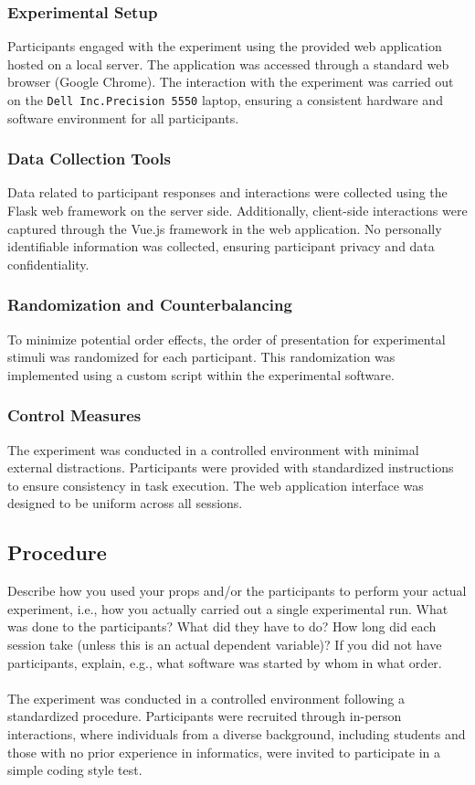 \documentclass{article}
\begin{document}
\subsubsection*{Experimental Setup}
Participants engaged with the experiment using the provided web application hosted on a local server. The application was accessed through a standard web browser (Google Chrome). The interaction with the experiment was carried out on the \texttt{Dell Inc.Precision 5550} laptop, ensuring a consistent hardware and software environment for all participants.

\subsubsection*{Data Collection Tools}
Data related to participant responses and interactions were collected using the Flask web framework on the server side. Additionally, client-side interactions were captured through the Vue.js framework in the web application. No personally identifiable information was collected, ensuring participant privacy and data confidentiality.

\subsubsection*{Randomization and Counterbalancing}
To minimize potential order effects, the order of presentation for experimental stimuli was randomized for each participant. This randomization was implemented using a custom script within the experimental software.

\subsubsection*{Control Measures}
The experiment was conducted in a controlled environment with minimal external distractions. Participants were provided with standardized instructions to ensure consistency in task execution. The web application interface was designed to be uniform across all sessions.


\subsection{Procedure}
Describe how you used your props and/or the participants to perform your actual experiment, i.e., how you actually carried out a single experimental run. What was done to the participants? What did they have to do? How long did each session take (unless this is an actual dependent variable)? If you did not have participants, explain, e.g., what software was started by whom in what order.\\\\
The experiment was conducted in a controlled environment following a standardized procedure. Participants were recruited through in-person interactions, where individuals from a diverse background, including students and those with no prior experience in informatics, were invited to participate in a simple coding style test.
\end{document}
